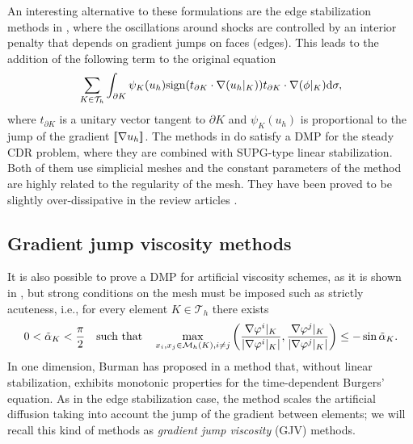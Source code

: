 An interesting alternative to these formulations are the edge stabilization methods in \cite{burman_stabilized_2005,burman_edge_2004}, where the oscillations around shocks are controlled by an interior penalty that depends on gradient jumps on faces (edges). This leads to the addition of the following term to the original equation
\begin{align*}%
\sum\limits_{K\in \mathcal{T}_h} \int_{\partial K} \psi_K(u_h) {\rm sign}(t_{\partial K}\cdot \nabla (u_h|_K))t_{\partial K}\cdot \nabla (\phi|_K) {\rm d} \sigma,
\end{align*}
where $t_{\partial K}$ is a unitary vector tangent to $\partial K$ and  $\psi_K(u_h)$ is proportional to the jump of the gradient $\lbrack\!\lbrack \nabla u_h \rbrack\!\rbrack$. The methods in \cite{burman_stabilized_2005,burman_edge_2004} do satisfy a DMP for the steady CDR problem, where they are combined with SUPG-type linear stabilization. Both of them use simplicial meshes and the constant parameters of the method are highly related to the regularity of the mesh. They have been proved to be slightly over-dissipative in the review articles \cite{john_spurious_2007,john_spurious_2008}. %



\subsection{Gradient jump viscosity methods}\label{s-gjv}
It is also possible to prove a DMP for artificial viscosity schemes, as it is shown in \cite{burman_nonlinear_2002}, but strong conditions on the mesh must be imposed such as strictly acuteness, i.e., for every element $K\in \mathcal{T}_h$ there exists 
\begin{align}\label{eq-condalpha}
0 < \tilde \alpha_K < \frac{\pi}{2} \quad \hbox{such  that} \quad \max\limits_{x_i, x_j \in \mathcal{M}_h(K),i \neq j} \left(\frac{\nabla\varphi^i|_K}{|\nabla\varphi^i|_K|},\frac{\nabla\varphi^j|_K}{|\nabla\varphi^j|_K|} \right) \leq - \sin \tilde \alpha_K.
\end{align}
In one dimension, Burman has proposed in \cite{burman_nonlinear_2007} a method that, without linear stabilization, exhibits monotonic properties for the time-dependent Burgers' equation. As in the edge stabilization case, the method scales the artificial diffusion taking into account the jump of the gradient between elements; we will recall this kind of methods as \emph{gradient jump viscosity} (GJV) methods. 

